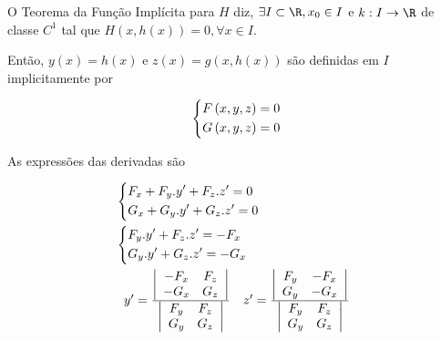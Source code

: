 \documentclass{book}
\begin{document}
\begin{dem}
    O Teorema da Fun\c c\~ao Impl\'icita para $H$ diz, $\exists I \subset \R, x_0 \in I$ e $k: I \to \R$ de classe $C^1$ tal que $H\left( {x,h\left( x \right)} \right) = 0,\forall x \in I$.

    Ent\~ao, $y\left( x \right) = h\left( x \right)$ e $z\left( x \right) = g\left( {x,h\left( x \right)} \right)$ s\~ao definidas em $I$ implicitamente por

\[
\left\{ \begin{gathered}
F\left( {x,y,z} \right) = 0 \hfill \\
G\left( {x,y,z} \right) = 0 \hfill \\
\end{gathered}  \right.
\]

As express\~oes das derivadas s\~ao

\[
\begin{gathered}
\left\{ \begin{gathered}
F_x  + F_y .y' + F_z .z' = 0 \hfill \\
G_x  + G_y .y' + G_z .z' = 0 \hfill \\
\end{gathered}  \right. \hfill \\
\left\{ \begin{gathered}
F_y .y' + F_z .z' =  - F_x  \hfill \\
G_y .y' + G_z .z' =  - G_x  \hfill \\
\end{gathered}  \right. \hfill \\
\begin{array}{*{20}c}
{y' = \frac{{\left| {\begin{array}{*{20}c}
{ - F_x } & {F_z }  \\
{ - G_x } & {G_z }  \\

\end{array} } \right|}}
{{\left| {\begin{array}{*{20}c}
{F_y } & {F_z }  \\
{G_y } & {G_z }  \\

\end{array} } \right|}}} & {z' = \frac{{\left| {\begin{array}{*{20}c}
{F_y } & { - F_x }  \\
{G_y } & { - G_x }  \\

\end{array} } \right|}}
{{\left| {\begin{array}{*{20}c}
{F_y } & {F_z }  \\
{G_y } & {G_z }  \\

\end{array} } \right|}}}  \\

\end{array}  \hfill \\
\end{gathered}
\]

\end{dem}
\end{document}
